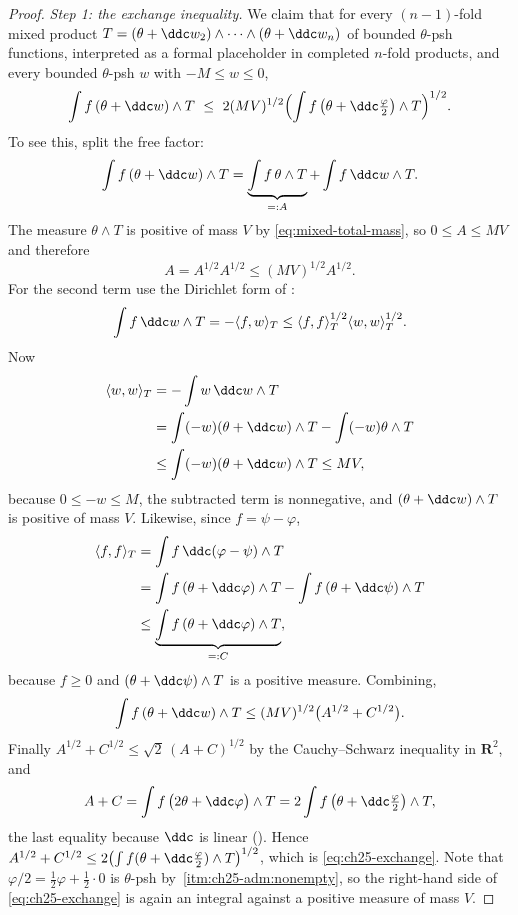 \begin{proof}
\emph{Step 1: the exchange inequality.}  We claim that for every
$(n-1)$-fold mixed product
$T=(\theta+\ddc w_2)\wedge\cdots\wedge(\theta+\ddc w_n)$ of bounded
$\theta$-psh functions, interpreted as a formal placeholder in completed
$n$-fold products, and every bounded $\theta$-psh $w$ with $-M\leq w\leq0$,
\begin{equation}
\label{eq:ch25-exchange}
 \int f\,(\theta+\ddc w)\wedge T
 \ \leq\ 2(MV)^{1/2}
   \Bigl(\int f\,\bigl(\theta+\ddc\tfrac\varphi2\bigr)\wedge T\Bigr)^{1/2}.
\end{equation}
To see this, split the free factor:
\[
 \int f\,(\theta+\ddc w)\wedge T
 =\underbrace{\int f\,\theta\wedge T}_{=:A}
  +\int f\,\ddc w\wedge T .
\]
The measure $\theta\wedge T$ is positive of mass $V$ by
\eqref{eq:mixed-total-mass}, so $0\leq A\leq MV$ and therefore
\begin{equation}
\label{eq:ch25-A-term}
 A=A^{1/2}A^{1/2}\leq(MV)^{1/2}A^{1/2}.
\end{equation}
For the second term use the Dirichlet form of
:
\[
 \int f\,\ddc w\wedge T=-\langle f,w\rangle_T
 \leq\langle f,f\rangle_T^{1/2}\langle w,w\rangle_T^{1/2}.
\]
Now
\[
 \begin{aligned}
 \langle w,w\rangle_T
 &=-\int w\,\ddc w\wedge T\\
 &=\int(-w)(\theta+\ddc w)\wedge T-\int(-w)\theta\wedge T\\
 &\leq\int(-w)(\theta+\ddc w)\wedge T\leq MV,
 \end{aligned}
\]
because $0\leq-w\leq M$, the subtracted term is nonnegative, and
$(\theta+\ddc w)\wedge T$ is positive of mass $V$.  Likewise, since
$f=\psi-\varphi$,
\[
 \begin{aligned}
 \langle f,f\rangle_T
 &=\int f\,\ddc(\varphi-\psi)\wedge T\\
 &=\int f\,(\theta+\ddc\varphi)\wedge T
   -\int f\,(\theta+\ddc\psi)\wedge T\\
 &\leq\underbrace{\int f\,(\theta+\ddc\varphi)\wedge T}_{=:C},
 \end{aligned}
\]
because $f\geq0$ and $(\theta+\ddc\psi)\wedge T$ is a positive measure.
Combining,
\[
 \int f\,(\theta+\ddc w)\wedge T\leq(MV)^{1/2}\bigl(A^{1/2}+C^{1/2}\bigr).
\]
Finally $A^{1/2}+C^{1/2}\leq\sqrt2\,(A+C)^{1/2}$ by the
Cauchy--Schwarz inequality in $\mathbf R^2$, and
\[
 A+C=\int f\,\bigl(2\theta+\ddc\varphi\bigr)\wedge T
 =2\int f\,\bigl(\theta+\ddc\tfrac\varphi2\bigr)\wedge T ,
\]
the last equality because $\ddc$ is linear
().  Hence
$A^{1/2}+C^{1/2}\leq2\bigl(\int f(\theta+\ddc\frac\varphi2)\wedge
T\bigr)^{1/2}$, which is \eqref{eq:ch25-exchange}.  Note that
$\varphi/2=\frac12\varphi+\frac12\cdot0$ is $\theta$-psh by
\,\cref{itm:ch25-adm:nonempty}, so the
right-hand side of \eqref{eq:ch25-exchange} is again an integral against a
positive measure of mass $V$.


\end{proof}
